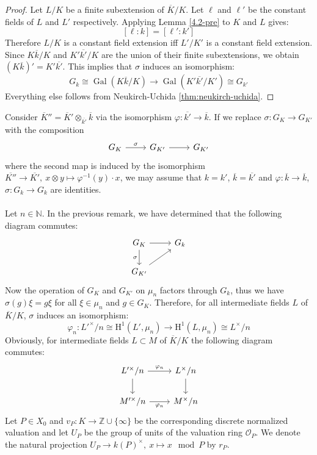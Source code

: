 \begin{proof}
Let $L/K$ be a finite subextension of $\overline{K}/K$. Let $\ell$ and $\ell'$ be the constant fields of $L$ and $L'$ respectively. Applying Lemma \ref{4.2-pre} to $K$ and $L$ gives:
\[ [\ell:k] = [\ell':k'] \]
Therefore $L/K$ is a constant field extension iff $L'/K'$ is a constant field extension. Since $K\overline{k}/K$ and $K'\overline{k'}/K$ are the union of their finite subextensions, we obtain $(K\overline{k})' = K'\overline{k'}$. This implies that $\sigma$ induces an isomorphism:
\[G_k \cong \operatorname{Gal}(K\overline{k}/K) \to \operatorname{Gal}(K'\overline{k'}/K')\cong G_{k'}\] 
Everything else follows from Neukirch-Uchida \ref{thm:neukirch-uchida}.
\end{proof}

\begin{remark}
Consider $\overline{K}'' = \overline{K}'\otimes_{\overline{k'}}\overline{k}$ via the isomorphism $\varphi: \overline{k'}\to \overline{k}$. If we replace $\sigma: G_K\to G_{K'}$ with the composition
\[ \begin{tikzcd}
G_K \ar[r, "\sigma"] & G_{K'} \ar[r] & G_{K'}
\end{tikzcd} \]
where the second map is induced by the isomorphism $\overline{K''}\to\overline{K'},\ x\otimes y\mapsto \varphi^{-1}(y)\cdot x$, we may assume that $k=k'$, $\overline{k} = \overline{k'}$ and $\varphi:\overline{k}\to\overline{k}$, $\sigma: G_k\to G_k$ are identities.
\end{remark}

\paragraph{} Let $n\in\mathbb{N}$. In the previous remark, we have determined that the following diagram commutes: 
\[ \begin{tikzcd}
G_K \ar[r]\ar[d, "\sigma"'] & G_k\\
G_{K'}\ar[ru]
\end{tikzcd} \]
Now the operation of $G_K$ and $G_{K'}$ on $\mu_n$ factors through $G_k$, thus we have $\sigma(g)\xi = g\xi$ for all $\xi\in\mu_n$ and $g\in G_K$. Therefore, for all intermediate fields $L$ of $\overline{K}/K$, $\sigma$ induces an isomorphism:
\[ \varphi_n:L'^\times/n \cong\mathrm{H}^1(L', \mu_n) \to \mathrm{H}^1(L,\mu_n) \cong L^\times/n \]
Obviously, for intermediate fields $L\subset M$ of $\overline{K}/K$ the following diagram commutes:
\[ \begin{tikzcd}
L'^\times/n \ar[r, "\varphi_n"]\dar & L^\times/n \dar\\
M'^\times/n \ar[r, "\varphi_n"'] & M^\times/n
\end{tikzcd} \]
Let $P\in X_0$ and $v_P:K\to\mathbb{Z}\cup\{\infty\}$ be the corresponding discrete normalized valuation and let $U_P$ be the group of units of the valuation ring $\mathcal{O}_P$. We denote the natural projection $U_P\to k(P)^\times,\ x\mapsto x\mod P$ by $r_P$. 

